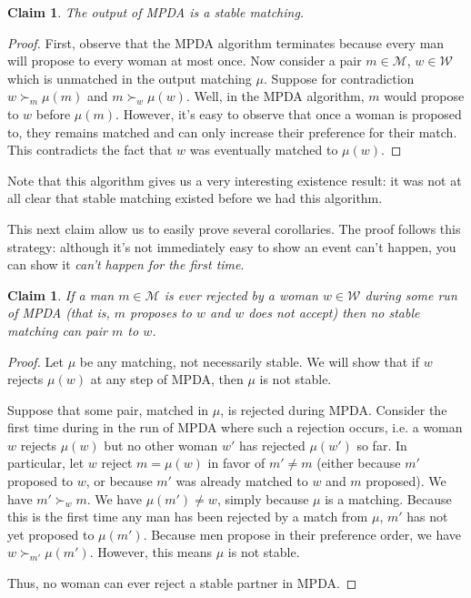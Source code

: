 \documentclass[12pt]{article}
\newcommand{\M}{\mathcal{M}}
\newcommand{\W}{\mathcal{W}}
\newtheorem{claim}[definition]{Claim}
\begin{document}
  \begin{claim}
    The output of MPDA is a stable matching.
  \end{claim}
  \begin{proof}
    First, observe that the MPDA algorithm terminates
    because every man will propose to every woman at most once.
    Now consider a pair $m\in \M$, $w\in \W$ which is unmatched in the output matching
    $\mu$. Suppose for contradiction $w\succ_m \mu(m)$ and $m\succ_w \mu(w)$.
    Well, in the MPDA algorithm, $m$ would propose to $w$ before $\mu(m)$.
    However, it's easy to observe that once a woman is proposed to,
    they remains matched and can only increase their preference for their match.
    This contradicts the fact that $w$ was eventually matched to $\mu(w)$.
  \end{proof}

  Note that this algorithm gives us a very interesting existence result: it was
  not at all clear that stable matching existed before we had this algorithm.

  This next claim allow us to easily prove several corollaries.
  The proof follows this strategy: although it's not immediately easy to show an
  event can't happen, you can show it \emph{can't happen for the first time}.

  \begin{claim}\label{claimRejectionUnstable}
    If a man $m\in \M$ is ever rejected by a woman $w\in \W$ during some run
    of MPDA (that is, $m$ proposes to $w$ and $w$ does not accept) then no stable
    matching can pair $m$ to $w$.
  \end{claim}
  \begin{proof}
    Let $\mu$ be any matching, not necessarily stable. We will show that if $w$
    rejects $\mu(w)$ at any step of MPDA, then $\mu$ is not stable.

    Suppose that some pair, matched in $\mu$, is rejected during MPDA.
    Consider the first time during in the run of MPDA where such a rejection
    occurs, i.e. a woman $w$ rejects $\mu(w)$ but no other woman $w'$ has
    rejected $\mu(w')$ so far.
    In particular, let $w$ reject $m=\mu(w)$ in favor of $m'\ne m$
    (either because $m'$ proposed to $w$,
    or because $m'$ was already matched to $w$ and $m$ proposed).
    We have $m'\succ_w m$.
    We have $\mu(m')\ne w$, simply because $\mu$ is a matching.
    Because this is the first time any man has been rejected by a match from
    $\mu$, $m'$ has not yet proposed to $\mu(m')$.
    Because men propose in their preference order, we have $w \succ_{m'} \mu(m')$.
    However, this means $\mu$ is not stable.

    Thus, no woman can ever reject a stable partner in MPDA.
  \end{proof}
\end{document}
